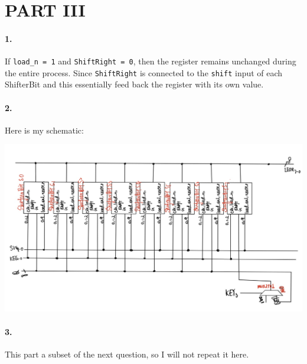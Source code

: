\documentclass[oneside, 10pt]{article}
\begin{document}
\section*{PART III}
\paragraph{1.} If \texttt{load\_n = 1} and \texttt{ShiftRight = 0}, then the 
register remains unchanged during the entire process. Since \texttt{ShiftRight}
is connected to the \texttt{shift} input of each ShifterBit and this essentially 
feed back the register with its own value. 
\paragraph{2.} Here is my schematic:
\begin{center}
    \includegraphics[scale=0.2]{q3_scheme.jpg}
\end{center}
\paragraph{3.} This part a subset of the next question, so I will not repeat it here.
\end{document}

